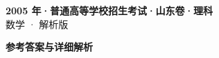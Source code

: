 \documentclass[zihao=-4, a4paper]{ctexart}
\begin{document}
\begin{center}
  {\Large\bfseries 2005 年·普通高等学校招生考试·山东卷·理科}\\[4pt]
  {\large 数学 · 解析版}
\end{center}
\medskip
{}

\clearpage
{}
\begin{center}{\Large\bfseries 参考答案与详细解析}\end{center}
\medskip

\end{document}
